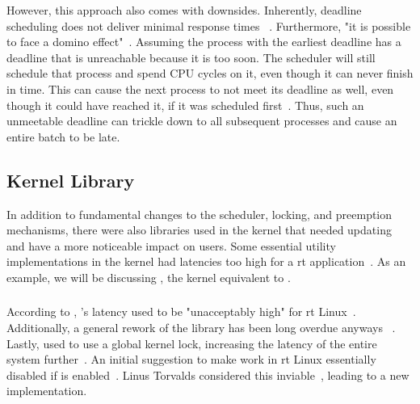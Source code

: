 \documentclass[10pt,twocolumn,a4paper]{article}
\begin{document}
However, this approach also comes with downsides.
Inherently, deadline scheduling does not deliver minimal response times ~\cite{bristot_de_oliveira_deadline_2018}.
Furthermore, "it is possible to face a domino effect"~\cite[Daniel Bristot de Oliveira]{bristot_de_oliveira_deadline_2018}.
Assuming the process with the earliest deadline has a deadline that is unreachable because it is too soon.
The scheduler will still schedule that process and spend CPU cycles on it, even though it can never finish in time.
This can cause the next process to not meet its deadline as well, even though it could have reached it, if it was scheduled first~\cite{bristot_de_oliveira_deadline_2018}.
Thus, such an unmeetable deadline can trickle down to all subsequent processes and cause an entire batch to be late.


\subsection{Kernel Library}
In addition to fundamental changes to the scheduler, locking, and preemption mechanisms, there were also libraries used in the kernel that needed updating and have a more noticeable impact on users.
Some essential utility implementations in the kernel had latencies too high for a \acrshort{rt} application~\cite{edge_discussion_2022}.
As an example, we will be discussing , the kernel equivalent to .

\subsubsection{}
According to \citeauthor{edge_discussion_2022}, 's latency used to be "unacceptably high" for \acrshort{rt} Linux~\cite{edge_discussion_2022}.
Additionally, a general rework of the library has been long overdue anyways ~\cite{edge_discussion_2022}.
Lastly,  used to use a global kernel lock, increasing the latency of the entire system further~\cite{gleixner_printk_2024}.
An initial suggestion to make  work in \acrshort{rt} Linux essentially disabled  if  is enabled~\cite{mladek_printk_2022}.
Linus Torvalds considered this inviable~\cite{torvalds_initial_2022}, leading to a new implementation.
\end{document}
